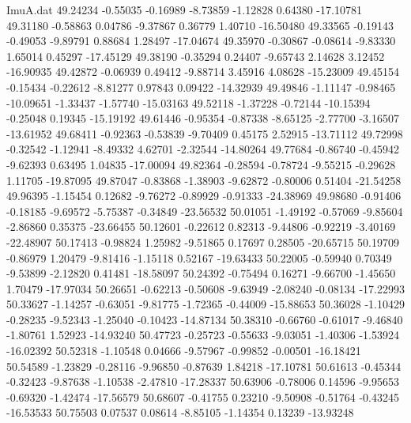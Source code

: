\begin{filecontents}{ImuA.dat}
  49.24234   -0.55035   -0.16989   -8.73859   -1.12828    0.64380  -17.10781
  49.31180   -0.58863    0.04786   -9.37867    0.36779    1.40710  -16.50480
  49.33565   -0.19143   -0.49053   -9.89791    0.88684    1.28497  -17.04674
  49.35970   -0.30867   -0.08614   -9.83330    1.65014    0.45297  -17.45129
  49.38190   -0.35294    0.24407   -9.65743    2.14628    3.12452  -16.90935
  49.42872   -0.06939    0.49412   -9.88714    3.45916    4.08628  -15.23009
  49.45154   -0.15434   -0.22612   -8.81277    0.97843    0.09422  -14.32939
  49.49846   -1.11147   -0.98465  -10.09651   -1.33437   -1.57740  -15.03163
  49.52118   -1.37228   -0.72144  -10.15394   -0.25048    0.19345  -15.19192
  49.61446   -0.95354   -0.87338   -8.65125   -2.77700   -3.16507  -13.61952
  49.68411   -0.92363   -0.53839   -9.70409    0.45175    2.52915  -13.71112
  49.72998   -0.32542   -1.12941   -8.49332    4.62701   -2.32544  -14.80264
  49.77684   -0.86740   -0.45942   -9.62393    0.63495    1.04835  -17.00094
  49.82364   -0.28594   -0.78724   -9.55215   -0.29628    1.11705  -19.87095
  49.87047   -0.83868   -1.38903   -9.62872   -0.80006    0.51404  -21.54258
  49.96395   -1.15454    0.12682   -9.76272   -0.89929   -0.91333  -24.38969
  49.98680   -0.91406   -0.18185   -9.69572   -5.75387   -0.34849  -23.56532
  50.01051   -1.49192   -0.57069   -9.85604   -2.86860    0.35375  -23.66455
  50.12601   -0.22612    0.82313   -9.44806   -0.92219   -3.40169  -22.48907
  50.17413   -0.98824    1.25982   -9.51865    0.17697    0.28505  -20.65715
  50.19709   -0.86979    1.20479   -9.81416   -1.15118    0.52167  -19.63433
  50.22005   -0.59940    0.70349   -9.53899   -2.12820    0.41481  -18.58097
  50.24392   -0.75494    0.16271   -9.66700   -1.45650    1.70479  -17.97034
  50.26651   -0.62213   -0.50608   -9.63949   -2.08240   -0.08134  -17.22993
  50.33627   -1.14257   -0.63051   -9.81775   -1.72365   -0.44009  -15.88653
  50.36028   -1.10429   -0.28235   -9.52343   -1.25040   -0.10423  -14.87134
  50.38310   -0.66760   -0.61017   -9.46840   -1.80761    1.52923  -14.93240
  50.47723   -0.25723   -0.55633   -9.03051   -1.40306   -1.53924  -16.02392
  50.52318   -1.10548    0.04666   -9.57967   -0.99852   -0.00501  -16.18421
  50.54589   -1.23829   -0.28116   -9.96850   -0.87639    1.84218  -17.10781
  50.61613   -0.45344   -0.32423   -9.87638   -1.10538   -2.47810  -17.28337
  50.63906   -0.78006    0.14596   -9.95653   -0.69320   -1.42474  -17.56579
  50.68607   -0.41755    0.23210   -9.50908   -0.51764   -0.43245  -16.53533
  50.75503    0.07537    0.08614   -8.85105   -1.14354    0.13239  -13.93248

\end{filecontents}
